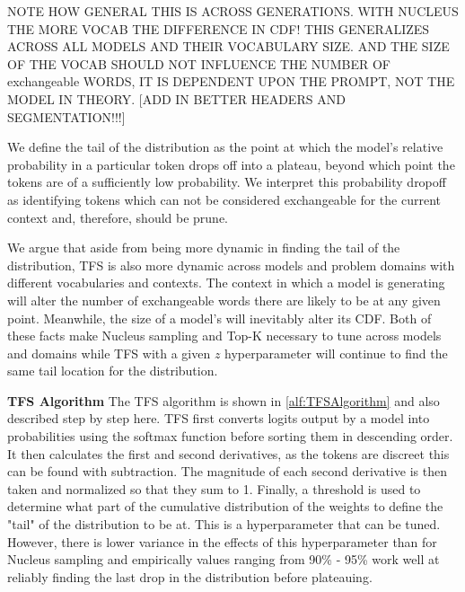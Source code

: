 \documentclass{article}
\begin{document}
NOTE HOW GENERAL THIS IS ACROSS GENERATIONS. WITH NUCLEUS THE MORE VOCAB THE DIFFERENCE IN CDF! THIS GENERALIZES ACROSS ALL MODELS AND THEIR VOCABULARY SIZE. AND THE SIZE OF THE VOCAB SHOULD NOT INFLUENCE THE NUMBER OF exchangeable WORDS, IT IS DEPENDENT UPON THE PROMPT, NOT THE MODEL IN THEORY. 
[ADD IN BETTER HEADERS AND SEGMENTATION!!!]

We define the tail of the distribution as the point at which the model’s relative probability in a particular token drops off into a plateau, beyond which point the tokens are of a sufficiently low probability. We interpret this probability dropoff as identifying tokens which can not be considered exchangeable for the current context and, therefore, should be prune.

We argue that aside from being more dynamic in finding the tail of the distribution, TFS is also more dynamic across models and problem domains with different vocabularies and contexts. The context in which a model is generating will alter the number of exchangeable words there are likely to be at any given point. Meanwhile, the size of a model's will inevitably alter its CDF. Both of these facts make Nucleus sampling and Top-K necessary to tune across models and domains while TFS with a given $z$ hyperparameter will continue to find the same tail location for the distribution.

\textbf{TFS Algorithm} The TFS algorithm is shown in \ref{alf:TFSAlgorithm} and also described step by step here. TFS first converts logits output by a model into probabilities using the softmax function before sorting them in descending order. It then calculates the first and second derivatives, as the tokens are discreet this can be found with subtraction. The magnitude of each second derivative is then taken and normalized so that they sum to 1. Finally, a threshold is used to determine what part of the cumulative distribution of the weights to define the "tail" of the distribution to be at. This is a hyperparameter that can be tuned. However, there is lower variance in the effects of this hyperparameter than for Nucleus sampling and empirically values ranging from 90\% - 95\% work well at reliably finding the last drop in the distribution before plateauing.
\end{document}
